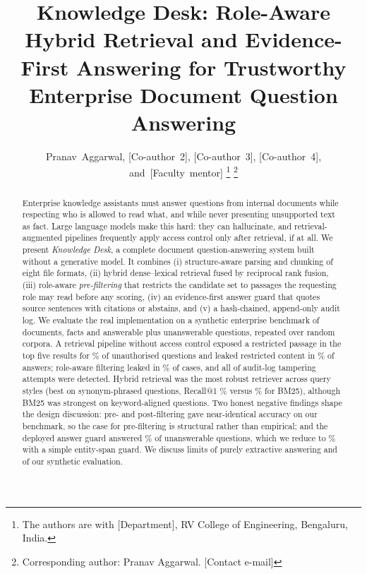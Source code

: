 \documentclass[journal]{IEEEtran}
\begin{document}
\title{Knowledge Desk: Role-Aware Hybrid Retrieval and Evidence-First Answering for Trustworthy Enterprise Document Question Answering}

\author{Pranav~Aggarwal,
        [Co-author~2],
        [Co-author~3],
        [Co-author~4],
        and~[Faculty~mentor]%
\thanks{The authors are with [Department], RV College of Engineering, Bengaluru, India.}%
\thanks{Corresponding author: Pranav Aggarwal. [Contact e-mail]}}


\maketitle

\begin{abstract}
Enterprise knowledge assistants must answer questions from internal documents while respecting who is allowed to read what, and while never presenting unsupported text as fact. Large language models make this hard: they can hallucinate, and retrieval-augmented pipelines frequently apply access control only after retrieval, if at all. We present \emph{Knowledge Desk}, a complete document question-answering system built without a generative model. It combines (i) structure-aware parsing and chunking of eight file formats, (ii) hybrid dense--lexical retrieval fused by reciprocal rank fusion, (iii) role-aware \emph{pre-filtering} that restricts the candidate set to passages the requesting role may read before any scoring, (iv) an evidence-first answer guard that quotes source sentences with citations or abstains, and (v) a hash-chained, append-only audit log. We evaluate the real implementation on a synthetic enterprise benchmark of \NDocs{} documents, \NFacts{} facts and \NAnswerable{} answerable plus \NUnanswerable{} unanswerable questions, repeated over \NSeeds{} random corpora. A retrieval pipeline without access control exposed a restricted passage in the top five results for \TopFiveNoAcl\% of unauthorised questions and leaked restricted content in \LeakNoAcl\% of answers; role-aware filtering leaked in \LeakPre\% of cases, and all \AuditDetected{} of \AuditTrials{} audit-log tampering attempts were detected. Hybrid retrieval was the most robust retriever across query styles (best on synonym-phrased questions, Recall@1 \RSynHyOne\% versus \RSynBmOne\% for BM25), although BM25 was strongest on keyword-aligned questions. Two honest negative findings shape the design discussion: pre- and post-filtering gave near-identical accuracy on our benchmark, so the case for pre-filtering is structural rather than empirical; and the deployed answer guard answered \GStdFalse\% of unanswerable questions, which we reduce to \GEAllFalse\% with a simple entity-span guard. We discuss limits of purely extractive answering and of our synthetic evaluation.
\end{abstract}
\end{document}
